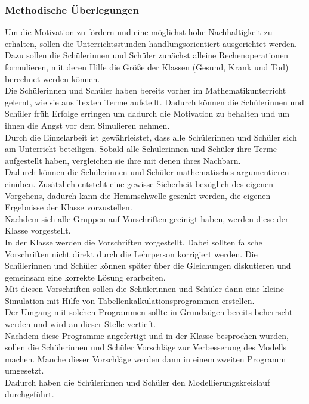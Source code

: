 \subsubsection{Methodische Überlegungen}
Um die Motivation zu fördern und eine möglichst hohe Nachhaltigkeit zu erhalten, sollen die Unterrichtsstunden handlungsorientiert ausgerichtet werden. Dazu sollen die Schülerinnen und Schüler zunächst alleine Rechenoperationen formulieren, mit deren Hilfe die Größe der Klassen (Gesund, Krank und Tod) berechnet werden können.\\
Die Schülerinnen und Schüler haben bereits vorher im Mathematikunterricht gelernt, wie sie aus Texten Terme aufstellt. Dadurch können die Schülerinnen und Schüler früh Erfolge erringen um dadurch die Motivation zu behalten und um ihnen die Angst vor dem Simulieren nehmen.\\
Durch die Einzelarbeit ist gewährleistet, dass alle Schülerinnen und Schüler sich am Unterricht beteiligen. Sobald alle Schülerinnen und Schüler ihre Terme aufgestellt haben, vergleichen sie ihre mit denen ihres Nachbarn.\\
Dadurch können die Schülerinnen und Schüler mathematisches argumentieren einüben. Zusätzlich entsteht eine gewisse Sicherheit bezüglich des eigenen Vorgehens, dadurch kann die Hemmschwelle gesenkt werden, die eigenen Ergebnisse der Klasse vorzustellen.\\
Nachdem sich alle Gruppen auf Vorschriften geeinigt haben, werden diese der Klasse vorgestellt.\\
In der Klasse werden die Vorschriften vorgestellt. Dabei sollten falsche Vorschriften nicht direkt durch die Lehrperson korrigiert werden. Die Schülerinnen und Schüler können später über die Gleichungen diskutieren und gemeinsam eine korrekte Lösung erarbeiten.\\
Mit diesen Vorschriften sollen die Schülerinnen und Schüler dann eine kleine Simulation mit Hilfe von Tabellenkalkulationsprogrammen erstellen.\\
Der Umgang mit solchen Programmen sollte in Grundzügen bereits beherrscht werden und wird an dieser Stelle vertieft.\\
Nachdem diese Programme angefertigt und in der Klasse besprochen wurden, sollen die Schülerinnen und Schüler Vorschläge zur Verbesserung des Modells machen. Manche dieser Vorschläge werden dann in einem zweiten Programm umgesetzt.\\
Dadurch haben die Schülerinnen und Schüler den Modellierungskreislauf durchgeführt.

